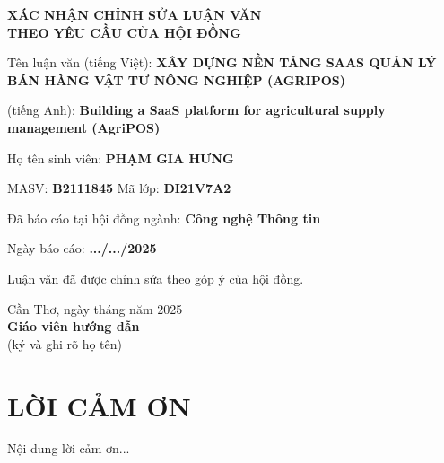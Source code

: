 \documentclass[13pt, a4paper]{report}
\begin{document}
\begin{center}
    {\fontsize{14}{16}\bfseries XÁC NHẬN CHỈNH SỬA LUẬN VĂN \\ THEO YÊU CẦU CỦA HỘI ĐỒNG}
\end{center}

\vfill %

\fontsize{13}{15}\selectfont
\setlength{\parindent}{0pt} %

\noindent Tên luận văn (tiếng Việt): \textbf{XÂY DỰNG NỀN TẢNG SAAS QUẢN LÝ BÁN HÀNG VẬT TƯ NÔNG NGHIỆP (AGRIPOS)}
\par\vspace{0.5cm}
\noindent (tiếng Anh): \textbf{Building a SaaS platform for agricultural supply management (AgriPOS)}
\par\vspace{1cm}
\noindent Họ tên sinh viên: \textbf{PHẠM GIA HƯNG}
\par
\noindent MASV: \textbf{B2111845} \hspace{3cm} Mã lớp: \textbf{DI21V7A2}
\par\vspace{1cm}
\noindent Đã báo cáo tại hội đồng ngành: \textbf{Công nghệ Thông tin}
\par
\noindent Ngày báo cáo: \textbf{.../.../2025}
\par\vspace{1cm}
\noindent Luận văn đã được chỉnh sửa theo góp ý của hội đồng.

\vfill %

\noindent\hfill %
\begin{minipage}{0.6\textwidth}
    \centering
    Cần Thơ, ngày \hspace{0.7cm} tháng \hspace{0.7cm} năm 2025 \\[1cm]
    \textbf{Giáo viên hướng dẫn} \\[3cm]
    (ký và ghi rõ họ tên)
\end{minipage}
\hspace{1.5cm} %

\vfill %

\chapter*{LỜI CẢM ƠN}
    Nội dung lời cảm ơn...
\end{document}
